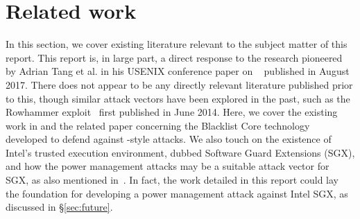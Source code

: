 \chapter{Related work}

In this section, we cover existing literature relevant to the subject matter of
this report. This report is, in large part, a direct response to the research
pioneered by Adrian Tang et al. in his USENIX conference paper on
\clkscrew{}~\cite{clkscrew} published in August 2017. There does not appear to
be any directly relevant literature published prior to this, though similar
attack vectors have been explored in the past, such as
the Rowhammer exploit~\cite{rowhammer} first published in June 2014. Here, we
cover the existing work in \cite{clkscrew} and the related paper
concerning the Blacklist Core technology~\cite{blacklistCore} developed to
defend against \clkscrew{}-style attacks. We also touch on the existence of
Intel's trusted execution environment, dubbed Software Guard Extensions (SGX),
and how the power management attacks may be a suitable attack vector for SGX, as also
mentioned in~\cite{securityOfSGX}. In fact, the work detailed in this report
could lay the foundation for developing a power management attack against
Intel SGX, as discussed in §\ref{sec:future}.






